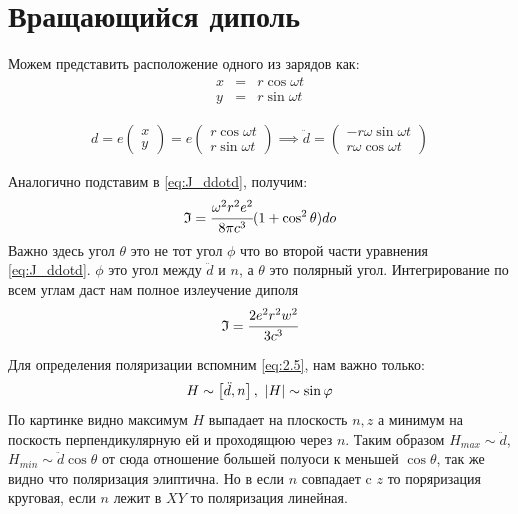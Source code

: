 \section{Вращающийся диполь}
Можем представить расположение одного из зарядов как:
\begin{eqnarray}
    x &=& r \cos \omega t\\
    y &=& r \sin \omega t
\end{eqnarray}

\begin{gather}
    d = e
    \begin{pmatrix}
        x \\ y
    \end{pmatrix}
    = e
    \begin{pmatrix}
        r\cos \omega t \\ r\sin \omega t
    \end{pmatrix}
    \implies 
    \ddot d =
    \begin{pmatrix}
        -r \omega \sin \omega t \\ r \omega \cos \omega t
    \end{pmatrix}
\end{gather}

Аналогично подставим в \ref{eq:J_ddotd}, получим:
\begin{eqnarray}
    \mathfrak{I} = \cfrac{\omega^2 r^2 e^2 }{8\pi c^3}(1 + \cos^2 \theta) do
\end{eqnarray}
Важно здесь угол $\theta$ это не тот угол $\phi$ что во 
второй части уравнения \ref{eq:J_ddotd}. $\phi$ это угол между $\ddot d$ и $n$, а $\theta$ 
это полярный угол.
Интегрирование по всем углам даст нам полное излеучение диполя 
\begin{equation}
    \mathfrak{I} = \cfrac{2e^2r^2w^2}{3c^3}
\end{equation}


Для определения поляризации вспомним \ref{eq:2.5}, нам важно только:
\begin{equation}
    H \sim \insqr{\ddot d, n}, \ \abs{H} \sim \sin \phi
\end{equation}
По картинке видно максимум $H$ выпадает на плоскость $n, z$ 
а минимум на поскость перпендикулярную ей и проходящюю через $n$. Таким 
образом $H_{max} \sim \ddot d$, $H_{min} \sim \ddot d \cos \theta$ от сюда 
отношение большей полуоси к меньшей $\cos \theta$, так же видно что поляризация 
элиптична. Но в если $n$ совпадает c $z$ то поряризация круговая, если 
$n$ лежит в $XY$ то поляризация линейная.


